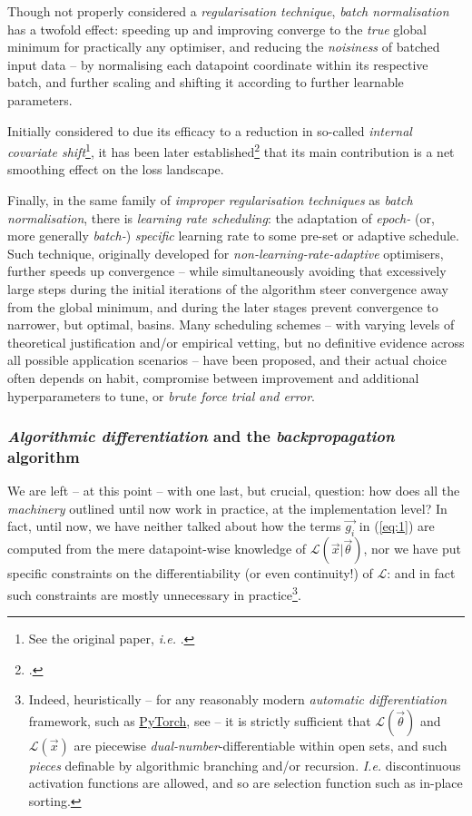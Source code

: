 Though not properly considered a \textit{regularisation technique}, \textit{batch normalisation} has a twofold effect: speeding up and improving converge to the \textit{true} global minimum for practically any optimiser, and reducing the \textit{noisiness} of batched input data -- by normalising each datapoint coordinate within its respective batch, and further scaling and shifting it according to further learnable parameters.

Initially considered to due its efficacy to a reduction in so-called \textit{internal covariate shift}\footnote{See the original paper, \textit{i.e.} \cite{IoffeSzegedy2015BatchNorm}.}, it has been later established\footnote{\cite{SanturkarEtAl2018BatchNorm}.} that its main contribution is a net smoothing effect on the loss landscape.

Finally, in the same family of \textit{improper regularisation techniques} as \textit{batch normalisation}, there is \textit{learning rate scheduling}: the adaptation of \textit{epoch-} (or, more generally \textit{batch-}) \textit{specific} learning rate to some pre-set or adaptive schedule. Such technique, originally developed for \textit{non-learning-rate-adaptive} optimisers, further speeds up convergence -- while simultaneously avoiding that excessively large steps during the initial iterations of the algorithm steer convergence away from the global minimum, and during the later stages prevent convergence to narrower, but optimal, basins. Many scheduling schemes -- with varying levels of theoretical justification and/or empirical vetting, but no definitive evidence across all possible application scenarios -- have been proposed, and their actual choice often depends on habit, compromise between improvement and additional hyperparameters to tune, or \textit{brute force} \textit{trial and error}.

\subsubsection{\textit{Algorithmic differentiation} and the \textit{backpropagation} algorithm}

We are left -- at this point -- with one last, but crucial, question: how does all the \textit{machinery} outlined until now work in practice, at the implementation level? In fact, until now, we have neither talked about how the terms $\vec{g_i}$ in (\ref{eq:1}) are computed from the mere datapoint-wise knowledge of $\mathcal{L}(\vec{x}|\vec{\theta})$, nor we have put specific constraints on the differentiability (or even continuity!) of $\mathcal{L}$: and in fact such constraints are mostly unnecessary in practice\footnote{Indeed, heuristically -- for any reasonably modern \textit{automatic differentiation} framework, such as \href{https://pytorch.org/}{PyTorch}, see \cite{PaszkeEtAl2019PyTorch} -- it is strictly sufficient that $\mathcal{L}(\vec{\theta})$ and $\mathcal{L}(\vec{x})$ are piecewise \textit{dual-number}-differentiable within open sets, and such \textit{pieces} definable by algorithmic branching and/or recursion. \textit{I.e.} discontinuous activation functions are allowed, and so are selection function such as in-place sorting.}.

